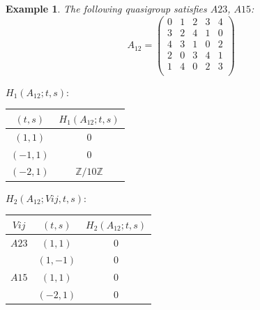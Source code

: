 \documentclass[11pt]{amsart}
\newtheorem{example}[theorem]{Example}
\theoremstyle{definition}
\newcommand{\Z}{\mathbb{Z}}
\begin{document}
\begin{example}
The following quasigroup satisfies 
$A23$, $A15$:
   \[ A_{12} = \left(
\begin{array}{ccccc}
 0 & 1 & 2 & 3 & 4 \\
 3 & 2 & 4 & 1 & 0 \\
 4 & 3 & 1 & 0 & 2 \\
 2 & 0 & 3 & 4 & 1 \\
 1 & 4 & 0 & 2 & 3 \\
\end{array}
\right) \]


\bigskip


$H_1(A_{12};t,s):$

\begin{center}
    
\begin{tabular}{c|c}
    $(t,s)$ & $H_1(A_{12};t,s)$  \\
    \hline
    $(1,1)$ & $0$ \\
    $(-1,1)$ & $0$ \\
    $(-2,1)$ & $\Z/10\Z$ \\
\end{tabular}
\end{center}
\bigskip

$H_2(A_{12};Vij,t,s):$

\begin{center}
    
\begin{tabular}{c|c|c}
    $Vij$ & $(t,s)$ & $H_2(A_{12};t,s)$  \\
    \hline

    $A23$ & $(1,1)$ & $0$ \\
        & $(1,-1)$ & $0$ \\
    $A15$ & $(1,1)$ & $0$ \\
    & $(-2,1)$ & $0$ \\
\end{tabular}
\end{center}
\end{example}
\end{document}
